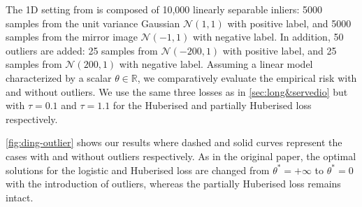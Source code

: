 The 1D setting from \textcite{ding_statistical_2013} is composed of 10,000 linearly separable inliers: 5000 samples from the unit variance Gaussian $\mathcal{N}(1,1)$ with positive label, and 5000 samples from the mirror image $\mathcal{N}(-1,1)$ with negative label.  In addition, 50 outliers are added: 25 samples from $\mathcal{N}(-200,1)$ with positive label, and 25 samples from $\mathcal{N}(200,1)$ with negative label.
Assuming a linear model characterized by a scalar $\theta \in \mathbb{R}$, we comparatively evaluate the empirical risk with and without outliers. We use the same three losses as in \autoref{sec:long&servedio} but with $\tau = 0.1$ and $\tau = 1.1$ for the Huberised and partially Huberised loss respectively. \footnotemark \


\autoref{fig:ding-outlier} shows our results where dashed and solid curves represent the cases with and without outliers respectively. As in the original paper, the optimal solutions for the logistic and Huberised loss are changed from $\theta^* = +\infty$ to $\theta^* = 0$ with the introduction of outliers, whereas the partially Huberised loss remains intact.

